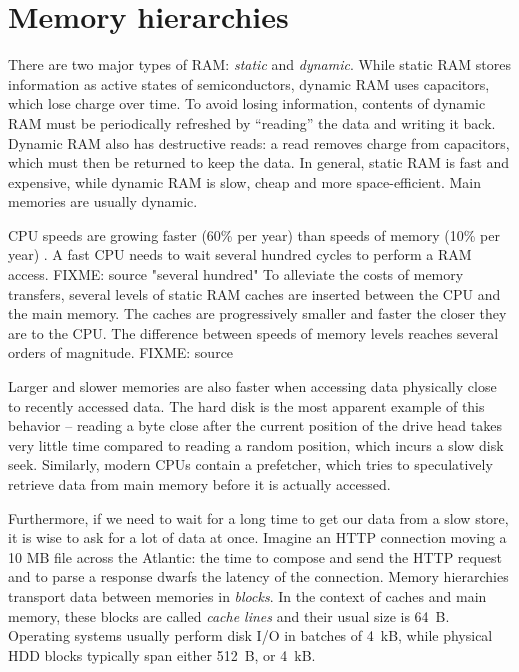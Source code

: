 \section{Memory hierarchies}
There are two major types of RAM: \emph{static} and \emph{dynamic}.
While static RAM stores information as active states of semiconductors, dynamic
RAM uses capacitors, which lose charge over time. To avoid losing information,
contents of dynamic RAM must be periodically refreshed by ``reading'' the data
and writing it back. Dynamic RAM also has destructive reads: a read removes
charge from capacitors, which must then be returned to keep the data.
In general, static RAM is fast and expensive, while dynamic RAM is slow,
cheap and more space-efficient. Main memories are usually dynamic.

CPU speeds are growing faster (60\% per year) than speeds of memory (10\% per
year) \cite{Ailamaki:2004:DAN:1316689.1316801}.
A fast CPU needs to wait several hundred cycles to perform a RAM access.
FIXME: source "several hundred"
To alleviate the costs of memory transfers, several levels of static RAM
caches are inserted between the CPU and the main memory. The caches are
progressively smaller and faster the closer they are to the CPU. The difference
between speeds of memory levels reaches several orders of magnitude. FIXME: source

Larger and slower memories are also faster when accessing data physically
close to recently accessed data. The hard disk is the most apparent example
of this behavior -- reading a byte close after the current position of the drive
head takes very little time compared to reading a random position, which incurs
a slow disk seek. %
Similarly, modern CPUs contain a prefetcher, which tries to speculatively
retrieve data from main memory before it is actually accessed.

Furthermore, if we need to wait for a long time to get our data from a slow
store, it is wise to ask for a lot of data at once. Imagine an HTTP connection
moving a 10 MB file across the Atlantic: the time to compose and send the HTTP
request and to parse a response dwarfs the latency of the connection.
Memory hierarchies transport data between memories in \emph{blocks}.
In the context of caches and main memory, these blocks are called
\emph{cache lines} and their usual size is 64~B.
Operating systems usually perform disk I/O in batches of 4~kB,
while physical HDD blocks typically span either 512~B, or 4~kB.

